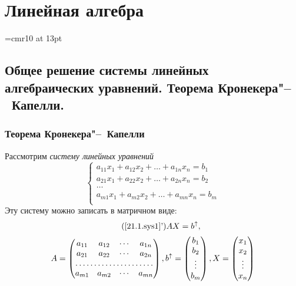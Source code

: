 \part[Линейная алгебра]{Линейная алгебра}

\font\Large=cmr10 at 13pt
\newcount\rowcount{}
\def\fudge#1{\smash{\hbox{\Large#1}}}
\def\doublyso{\kern+2em\smash{\vrule height \rowcount em depth .2em}\hidewidth}			%
\chapter{Общее решение системы линейных алгебраических уравнений. Теорема Кронекера"--~Капелли.}
\section{Теорема Кронекера"--~Капелли}
Рассмотрим \textit{систему линейных уравнений}
\begin{equation}\label{21.1.sys1}
\left\lbrace\begin{array}{crl}
a_{11}x_1+a_{12}x_2+\ldots+a_{1n}x_n=b_1\\
a_{21}x_1+a_{22}x_2+\ldots+a_{2n}x_n=b_2\\
\ldots \\
a_{m1}x_1+a_{m2}x_2+\ldots+a_{mn}x_n=b_m\\ 
\end{array}\right.\end{equation}
Эту систему можно записать в матричном виде:
\begin{equation*}\tag{\ref{21.1.sys1}'}
AX=b^{\uparrow},
\end{equation*}
\begin{equation*}
A=\begin{pmatrix}
a_{11} & a_{12} & \cdots & a_{1n} \\
a_{21} & a_{22} & \cdots & a_{2n} \\
\hdotsfor{4} \\
a_{m1} & a_{m2} & \cdots & a_{mn} \\
\end{pmatrix},
b^\uparrow=\begin{pmatrix}
b_1 \\ b_2 \\ \vdots \\ b_m \\
\end{pmatrix},
X=\begin{pmatrix}
x_1 \\ x_2 \\ \vdots \\ x_n \\
\end{pmatrix}
\end{equation*}
